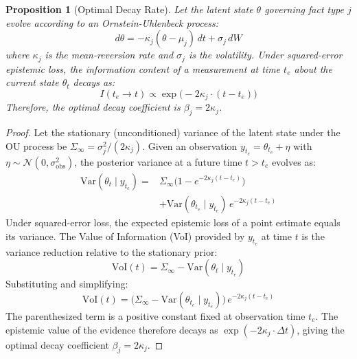 \documentclass[conference]{IEEEtran}
\newtheorem{proposition}{Proposition}
\begin{document}
\begin{proposition}[Optimal Decay Rate]
\label{prop:beta}
Let the latent state $\theta$ governing fact type $j$ evolve according to an Ornstein-Uhlenbeck process:
\begin{equation}
    d\theta = -\kappa_j(\theta - \mu_j)\,dt + \sigma_j\,dW
    \label{eq:ou}
\end{equation}
where $\kappa_j$ is the mean-reversion rate and $\sigma_j$ is the volatility. Under squared-error epistemic loss, the information content of a measurement at time $t_e$ about the current state $\theta_t$ decays as:
\begin{equation}
    I(t_e \to t) \propto \exp\!\big(-2\kappa_j \cdot (t - t_e)\big)
    \label{eq:info_decay}
\end{equation}
Therefore, the optimal decay coefficient is $\beta_j = 2\kappa_j$.
\end{proposition}

\begin{proof}
Let the stationary (unconditioned) variance of the latent state under the OU process be $\Sigma_{\infty} = \sigma_j^2 / (2\kappa_j)$. Given an observation $y_{t_e} = \theta_{t_e} + \eta$ with $\eta \sim \mathcal{N}(0, \sigma^2_{\text{obs}})$, the posterior variance at a future time $t > t_e$ evolves as:
\begin{equation}
\begin{aligned}
    \text{Var}(\theta_t \mid y_{t_e}) ={}&
        \Sigma_{\infty}\big(1 - e^{-2\kappa_j(t-t_e)}\big) \\
        &+ \text{Var}(\theta_{t_e} \mid y_{t_e})\, e^{-2\kappa_j(t-t_e)}
\end{aligned}
\end{equation}
Under squared-error loss, the expected epistemic loss of a point estimate equals its variance. The Value of Information (VoI) provided by $y_{t_e}$ at time $t$ is the variance reduction relative to the stationary prior:
\begin{equation}
    \text{VoI}(t) = \Sigma_{\infty} - \text{Var}(\theta_t \mid y_{t_e})
\end{equation}
Substituting and simplifying:
\begin{equation}
    \text{VoI}(t) = \big(\Sigma_{\infty} - \text{Var}(\theta_{t_e} \mid y_{t_e})\big)\, e^{-2\kappa_j(t - t_e)}
\end{equation}
The parenthesized term is a positive constant fixed at observation time $t_e$. The epistemic value of the evidence therefore decays as $\exp(-2\kappa_j \cdot \Delta t)$, giving the optimal decay coefficient $\beta_j = 2\kappa_j$.
\end{proof}
\end{document}
